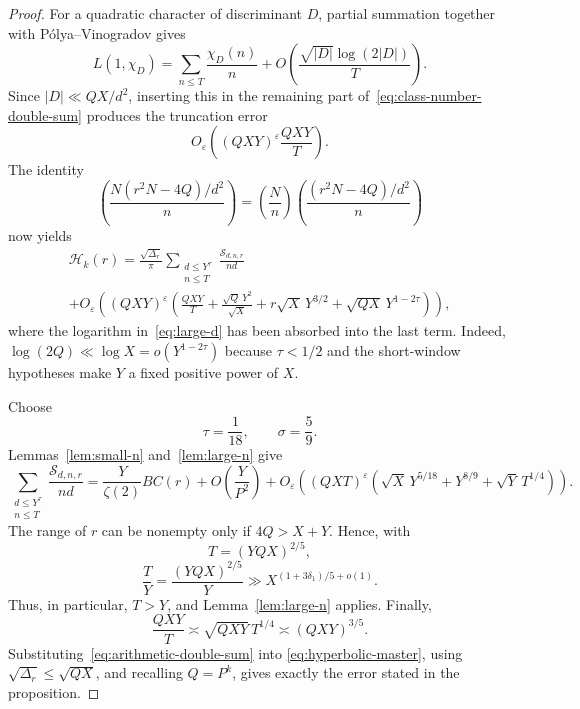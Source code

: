 \documentclass[10pt,a4paper]{amsart}
\begin{document}
\begin{proof}
For a quadratic character of discriminant $D$, partial summation together with P\'olya--Vinogradov gives
\[
L(1,\chi_D)
=
\sum_{n\leq T}\frac{\chi_D(n)}n
+
O\left(\frac{\sqrt{|D|}\log(2|D|)}T\right).
\]
Since $|D|\ll QX/d^2$, inserting this in the remaining part of~\eqref{eq:class-number-double-sum} produces the truncation error
\begin{equation}\label{eq:L-truncation-error}
O_\varepsilon\left(
(QXY)^\varepsilon\frac{QXY}{T}
\right).
\end{equation}
The identity
\[
\left(\frac{N(r^2N-4Q)/d^2}{n}\right)
=
\left(\frac Nn\right)
\left(\frac{(r^2N-4Q)/d^2}{n}\right)
\]
now yields
\begin{multline}\label{eq:hyperbolic-master}
\mathcal H_k(r)
=
\frac{\sqrt{\Delta_r}}{\pi}
\sum_{\substack{d\leq Y^\tau\\n\leq T}}
\frac{\mathcal S_{d,n,r}}{nd}
\\
+
O_\varepsilon\left(
(QXY)^\varepsilon
\left(
\frac{QXY}{T}
+\frac{\sqrt Q\,Y^2}{\sqrt X}
+r\sqrt X\,Y^{3/2}
+\sqrt{QX}\,Y^{1-2\tau}
\right)
\right),
\end{multline}
where the logarithm in~\eqref{eq:large-d} has been absorbed into the last term.
Indeed, $\log(2Q)\ll\log X=o(Y^{1-2\tau})$ because $\tau<1/2$ and the short-window hypotheses make $Y$ a fixed positive power of $X$.

Choose
\[
\tau=\frac1{18},
\qquad
\sigma=\frac59.
\]
Lemmas~\ref{lem:small-n} and~\ref{lem:large-n} give
\begin{equation}\label{eq:arithmetic-double-sum}
\sum_{\substack{d\leq Y^\tau\\n\leq T}}
\frac{\mathcal S_{d,n,r}}{nd}
=
\frac{Y}{\zeta(2)}BC(r)
+
O\left(\frac{Y}{P^2}\right)
+
O_\varepsilon\left(
(QXT)^\varepsilon
\left(
\sqrt X\,Y^{5/18}
+Y^{8/9}
+\sqrt Y\,T^{1/4}
\right)
\right).
\end{equation}
The range of $r$ can be nonempty only if $4Q>X+Y$.
Hence, with
\[
T=(YQX)^{2/5},
\]
\[
\frac TY
=
\frac{(YQX)^{2/5}}Y
\gg X^{(1+3\delta_1)/5+o(1)}.
\]
Thus, in particular, $T>Y$, and Lemma~\ref{lem:large-n} applies.
Finally,
\[
\frac{QXY}{T}
\asymp
\sqrt{QXY}\,T^{1/4}
\asymp
(QXY)^{3/5}.
\]
Substituting~\eqref{eq:arithmetic-double-sum} into \eqref{eq:hyperbolic-master}, using $\sqrt{\Delta_r}\leq\sqrt{QX}$, and recalling $Q=P^k$, gives exactly the error stated in the
proposition.
\end{proof}
\end{document}
